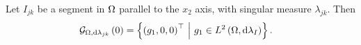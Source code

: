 \begin{prop} \label{prop:3DGradZeroSegment}
	Let $I_{jk}$ be a segment in $\Omega$ parallel to the $x_2$ axis, with singular measure $\lambda_{jk}$.
	Then 
	\begin{align*}
		\mathcal{G}_{ \Omega, \mathrm{d}\lambda_{jk}}\left( 0 \right) &= \left\{  \left( g_1, 0, 0 \right)^{\top} \ \middle\vert \  g_1\in L^{2}\left( \Omega,\mathrm{d}\lambda_I \right)  \right\}.
	\end{align*}
\end{prop}
%	
%	

